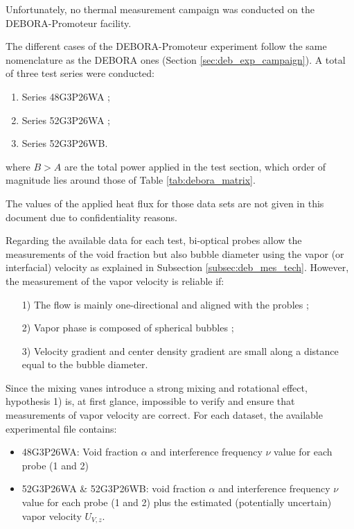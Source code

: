 \begin{note*}{}
Unfortunately, no thermal measurement campaign was conducted on the DEBORA-Promoteur facility.
\end{note*}

\npar


The different cases of the DEBORA-Promoteur experiment follow the same nomenclature as the DEBORA ones (Section \ref{sec:deb_exp_campaign}). A total of three test series were conducted:

\begin{enumerate}
\item Series 48G3P26WA ;
\item Series 52G3P26WA ; 
\item Series 52G3P26WB.
\end{enumerate}
where $B > A$ are the total power applied in the test section, which order of magnitude lies around those of Table \ref{tab:debora_matrix}.

\begin{note*}{}
The values of the applied heat flux for those data sets are not given in this document due to confidentiality reasons.
\end{note*}

\npar

Regarding the available data for each test, bi-optical probes allow the measurements of the void fraction but also bubble diameter using the vapor (or interfacial) velocity as explained in Subsection \ref{subsec:deb_mes_tech}. However, the measurement of the vapor velocity is reliable if:
\begin{enumerate}
\item[1)] The flow is mainly one-directional and aligned with the probles ;
\item[2)] Vapor phase is composed of spherical bubbles ;
\item[3)] Velocity gradient and center density gradient are small along a distance equal to the bubble diameter.
\end{enumerate}

Since the mixing vanes introduce a strong mixing and rotational effect, hypothesis 1) is, at first glance, impossible to verify and ensure that measurements of vapor velocity are correct. For each dataset, the available experimental file contains:

\begin{itemize}
\item 48G3P26WA: Void fraction $\alpha$ and interference frequency $\nu$ value for each probe (1 and 2)
\item 52G3P26WA \& 52G3P26WB: void fraction $\alpha$ and interference frequency $\nu$ value for each probe (1 and 2) plus the estimated (potentially uncertain) vapor velocity $U_{V,z}$.
\end{itemize}


